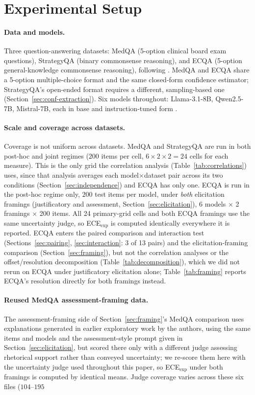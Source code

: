 \documentclass[letterpaper]{article} %
\begin{document}
\section{Experimental Setup} \paragraph{Data and models.} Three question-answering datasets: MedQA (5-option clinical board exam questions), StrategyQA (binary commonsense reasoning), and ECQA (5-option general-knowledge commonsense reasoning), following \citet{jin2021disease,geva2021did,aggarwaletal2021ecqa}. MedQA and ECQA share a 5-option multiple-choice format and the same closed-form confidence estimator; StrategyQA's open-ended format requires a different, sampling-based one (Section~\ref{sec:conf-extraction}). Six models throughout: Llama-3.1-8B, Qwen2.5-7B, Mistral-7B, each in base and instruction-tuned form \citep{grattafiori2024llama,qwen2025technical,jiang2023mistral}. \paragraph{Scale and coverage across datasets.}Coverage is not uniform across datasets. MedQA and StrategyQA are run in both post-hoc and joint regimes ($200$ items per cell, $6\times2\times2=24$ cells for each measure). This is the only grid the correlation analysis (Table~\ref{tab:correlations}) uses, since that analysis averages each model$\times$dataset pair across its two conditions (Section~\ref{sec:independence}) and ECQA has only one. ECQA is run in the post-hoc regime only, $200$ test items per model, under \emph{both} elicitation framings (justificatory and assessment, Section~\ref{sec:elicitation}), 6 models $\times$ 2 framings $\times$ 200 items. All 24 primary-grid cells and both ECQA framings use the same uncertainty judge, so ECE$_{\text{exp}}$ is computed identically everywhere it is reported. ECQA enters the paired comparison and interaction test (Sections~\ref{sec:pairing}, \ref{sec:interaction}: 3 of 13 pairs) and the elicitation-framing comparison (Section~\ref{sec:framing}), but not the correlation analyses or the offset/resolution decomposition (Table~\ref{tab:decomposition}), which we did not rerun on ECQA under justificatory elicitation alone; Table~\ref{tab:framing} reports ECQA's resolution directly for both framings instead. \paragraph{Reused MedQA assessment-framing data.} The assessment-framing side of Section~\ref{sec:framing}'s MedQA comparison uses explanations generated in earlier exploratory work by the authors, using the same items and models and the assessment-style prompt given in Section~\ref{sec:elicitation}, but scored there only with a different judge assessing rhetorical support rather than conveyed uncertainty; we re-score them here with the uncertainty judge used throughout this paper, so ECE$_{\text{exp}}$ under both framings is computed by identical means. Judge coverage varies across these six files ($104$--$195$ 
\end{document}
